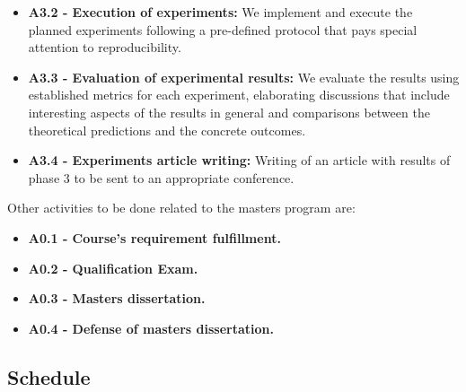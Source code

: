 \documentclass[English]{style/ic-tese-v3}
\begin{document}
\begin{itemize}
    \item \textbf{A3.2 - Execution of experiments:}
        We implement and execute the planned experiments following a pre-defined protocol that
        pays special attention to reproducibility.

    \item \textbf{A3.3 - Evaluation of experimental results:}
        We evaluate the results using established metrics for each experiment,
        elaborating discussions that include interesting aspects of the results in general and
        comparisons between the theoretical predictions and the concrete outcomes.

    \item \textbf{A3.4 - Experiments article writing:}
        Writing of an article with results of phase $3$ to be sent to an appropriate conference.
\end{itemize}

Other activities to be done related to the masters program are:
\begin{itemize}
    \item \textbf{A0.1 - Course's requirement fulfillment.}
    \item \textbf{A0.2 - Qualification Exam.}
    \item \textbf{A0.3 - Masters dissertation.}
    \item \textbf{A0.4 - Defense of masters dissertation.}
\end{itemize}

\subsection{Schedule}
\end{document}
